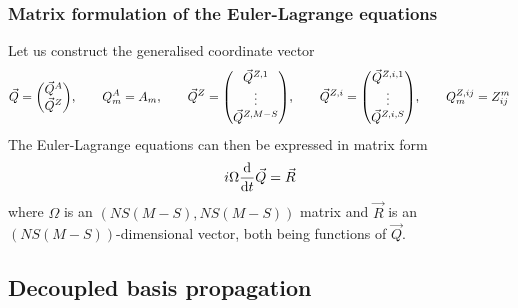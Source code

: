 \documentclass[12pt]{article}
\begin{document}
	\subsubsection{Matrix formulation of the Euler-Lagrange equations}
	Let us construct the generalised coordinate vector
	\begin{equation}
	\vec{Q} = \mqty(\vec{Q}^A \\ \vec{Q}^Z),\qquad Q^A_m = A_m, \qquad \vec{Q}^Z=\mqty(\vec{Q}^{Z,1} \\ \vdots \\ \vec{Q}^{Z,M-S}), \qquad \vec{Q}^{Z,i} = \mqty(\vec{Q}^{Z,i,1} \\ \vdots \\ \vec{Q}^{Z,i,S}), \qquad Q^{Z,ij}_m = Z^m_{ij}
	\end{equation}
	The Euler-Lagrange equations can then be expressed in matrix form
	\begin{equation}
	i\Omega\dv{t}\vec{Q}=\vec{R}
	\end{equation}
	where $\Omega$ is an $(NS(M-S),NS(M-S))$ matrix and $\vec{R}$ is an $(NS(M-S))$-dimensional vector, both being functions of $\vec{Q}$.
	
	\subsection{Decoupled basis propagation} \label{sec: decoupled basis}
	
	\appendix
	
\end{document}
